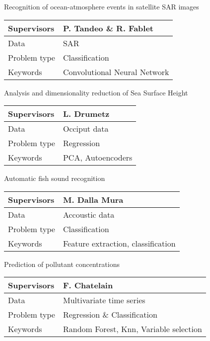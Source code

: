 \documentclass[pressentation,10pt,aspectratio=1610, xcolor=table]{beamer}
\begin{document}
\begin{frame}[label={sec:org93ebb97}]{Recognition of ocean-atmosphere events in satellite SAR images}
\begin{center}
\begin{tabular}{ll}
\toprule
Supervisors & P. Tandeo \& R. Fablet\\
\midrule
Data & SAR\\
\midrule
Problem type & Classification\\
\midrule
Keywords & Convolutional Neural Network\\
\bottomrule
\end{tabular}
\end{center}
\end{frame}


\begin{frame}[label={sec:orge796d03}]{Analysis and dimensionality reduction of Sea Surface Height}
\begin{center}
\begin{tabular}{ll}
\toprule
Supervisors & L. Drumetz\\
\midrule
Data & Occiput data\\
\midrule
Problem type & Regression\\
\midrule
Keywords & PCA, Autoencoders\\
\bottomrule
\end{tabular}
\end{center}
\end{frame}


\begin{frame}[label={sec:org9ff81dd}]{Automatic fish sound recognition}
\begin{center}
\begin{tabular}{ll}
\toprule
Supervisors & M. Dalla Mura\\
\midrule
Data & Accoustic data\\
\midrule
Problem type & Classification\\
\midrule
Keywords & Feature extraction, classification\\
\bottomrule
\end{tabular}
\end{center}
\end{frame}


\begin{frame}[label={sec:orgd337661}]{Prediction of pollutant concentrations}
\begin{center}
\begin{tabular}{ll}
\toprule
Supervisors & F. Chatelain\\
\midrule
Data & Multivariate time series\\
\midrule
Problem type & Regression \& Classification\\
\midrule
Keywords & Random Forest, Knn, Variable selection\\
\bottomrule
\end{tabular}
\end{center}
\end{frame}
\end{document}
